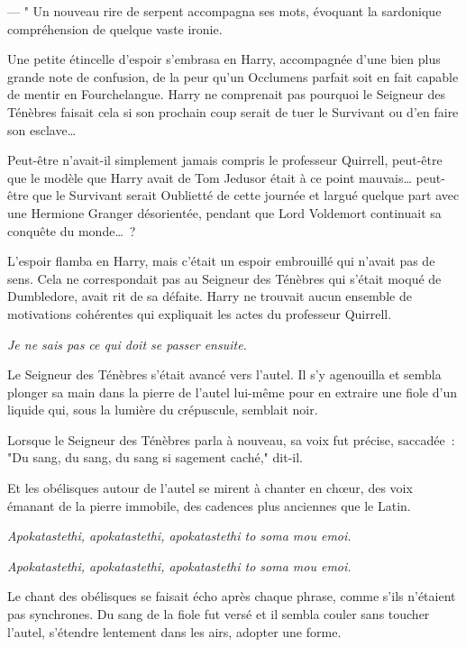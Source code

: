 --- " Un nouveau rire de serpent accompagna ses mots, évoquant la sardonique compréhension de quelque vaste ironie.

Une petite étincelle d'espoir s'embrasa en Harry, accompagnée d'une bien plus grande note de confusion, de la peur qu'un Occlumens parfait soit en fait capable de mentir en Fourchelangue. Harry ne comprenait pas pourquoi le Seigneur des Ténèbres faisait cela si son prochain coup serait de tuer le Survivant ou d'en faire son esclave…

Peut-être n'avait-il simplement jamais compris le professeur Quirrell, peut-être que le modèle que Harry avait de Tom Jedusor était à ce point mauvais… peut-être que le Survivant serait Oublietté de cette journée et largué quelque part avec une Hermione Granger désorientée, pendant que Lord Voldemort continuait sa conquête du monde…~?

L'espoir flamba en Harry, mais c'était un espoir embrouillé qui n'avait pas de sens. Cela ne correspondait pas au Seigneur des Ténèbres qui s'était moqué de Dumbledore, avait rit de sa défaite. Harry ne trouvait aucun ensemble de motivations cohérentes qui expliquait les actes du professeur Quirrell.

\emph{Je ne sais pas ce qui doit se passer ensuite.}

Le Seigneur des Ténèbres s'était avancé vers l'autel. Il s'y agenouilla et sembla plonger sa main dans la pierre de l'autel lui-même pour en extraire une fiole d'un liquide qui, sous la lumière du crépuscule, semblait noir.

Lorsque le Seigneur des Ténèbres parla à nouveau, sa voix fut précise, saccadée~: "Du sang, du sang, du sang si sagement caché," dit-il.

Et les obélisques autour de l'autel se mirent à chanter en chœur, des voix émanant de la pierre immobile, des cadences plus anciennes que le Latin.

\emph{Apokatastethi, apokatastethi, apokatastethi to soma mou emoi.}

\emph{Apokatastethi, apokatastethi, apokatastethi to soma mou emoi.}

Le chant des obélisques se faisait écho après chaque phrase, comme s'ils n'étaient pas synchrones. Du sang de la fiole fut versé et il sembla couler sans toucher l'autel, s'étendre lentement dans les airs, adopter une forme.

